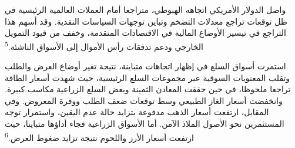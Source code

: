 واصل الدولار الأمريكي اتجاهه الهبوطي، متراجعا أمام العملات العالمية الرئيسية في ظل توقعات تراجع معدلات التضخم وتباين توجهات السياسات النقدية. وقد أسهم هذا التراجع في تيسير الأوضاع المالية في الاقتصادات المتقدمة، وخفف من قيود التمويل الخارجي ودعم تدفقات رأس الأموال إلى الأسواق الناشئة.\textsuperscript{5}

استمرت أسواق السلع في إظهار اتجاهات متباينة، نتيجة تغير أوضاع العرض والطلب وتقلب المعنويات السوقية عبر مجموعات السلع الرئيسية، حيث شهدت أسعار الطاقة تراجعا ملحوظا، في حين حققت المعادن الثمينة وبعض السلع الزراعية مكاسب كبيرة. وانخفضت أسعار الغاز الطبيعي وسط توقعات ضعف الطلب ووفرة المعروض. وفي المقابل، ارتفعت أسعار الذهب مدفوعة بتزايد حالة عدم اليقين، واستمرار توجه المستثمرين نحو الأصول الملاذ الآمن. أما الأسواق الزراعية فجاء أداؤها متباينا، حيث ارتفعت أسعار الأرز واللحوم نتيجة تزايد ضغوط العرض.\textsuperscript{6}
